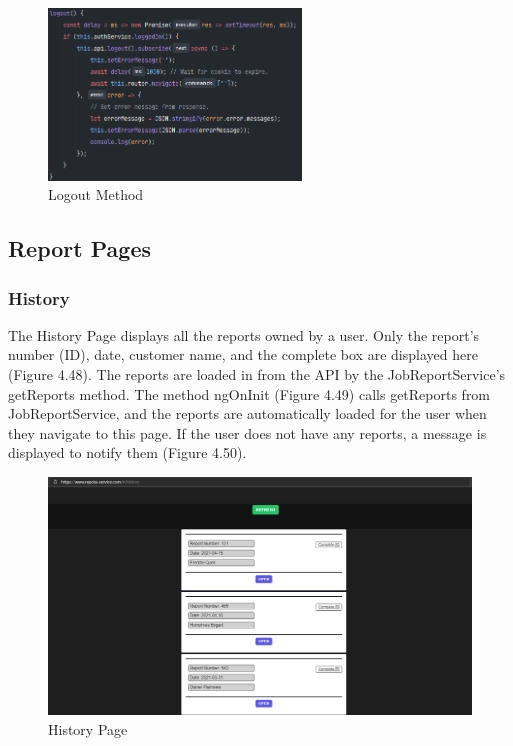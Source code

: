 \begin{figure}[H]
    \caption{Logout Method}
    \label{image:logoutMethod}
    \centering
    \includegraphics[width=0.6\textwidth]{images/repota/account_pages/logout_method.png}
\end{figure}

\subsection{Report Pages}

\subsubsection{History}
The History Page displays all the reports owned by a user. Only the report's number (ID), date, customer name, and the complete box are displayed here (Figure 4.48). The reports are loaded in from the API by the JobReportService's getReports method. The method ngOnInit (Figure 4.49) calls getReports from JobReportService, and the reports are automatically loaded for the user when they navigate to this page. If the user does not have any reports, a message is displayed to notify them (Figure 4.50). 

\begin{figure}[H]
    \caption{History Page}
    \label{image:historyPage}
    \centering
    \includegraphics[width=1.0\textwidth]{images/repota/UI/history-page.png}
\end{figure}

